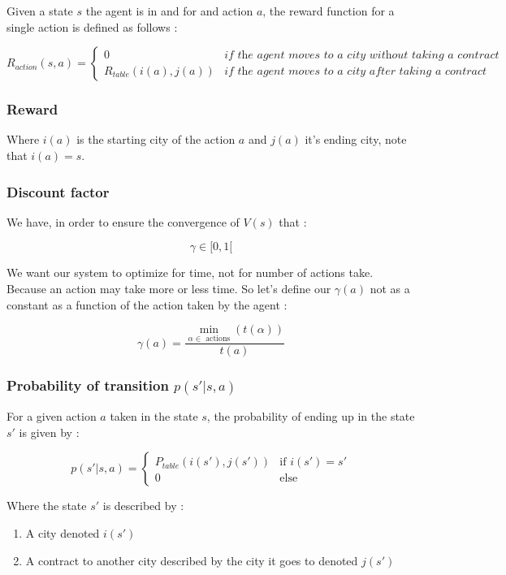 \documentclass[11pt]{article}
\begin{document}
Given a state $s$ the agent is in and for and action $a$, the reward function for a single action is defined as follows :

\[R_{action}(s,a) = \begin{cases}
    0               & \textit{if the agent moves to a city without taking a contract} \\
    R_{table}(i(a),j(a))    & \textit{if the agent moves to a city after taking a contract}
\end{cases}\]

\subsubsection{Reward}

Where  $i(a)$ is the starting city of the action $a$ and $j(a)$ it's ending city, note that $i(a) = s$.

\subsubsection{Discount factor}

We have, in order to ensure the convergence of $V(s)$ that :

\[ \gamma \in [0,1[ \]

We want our system to optimize for time, not for number of actions take. Because an action may take more or less time. So let's define our $\gamma(a)$ not as a constant as a function of the action taken by the agent :

\[\gamma (a) = \frac{ \underset{\alpha \in \text{ actions}}{\min} (t(\alpha))}{t(a)}\]


\subsubsection{Probability of transition $p(s'|s,a)$}

For a given action $a$ taken in the state $s$, the probability of ending up in the state $s'$ is given by :

\[p(s'|s,a) = \begin{cases}
    P_{table}(i(s'),j(s'))  & \text{if }i(s')=s' \\
    0                       & \text{else}
\end{cases}\]

Where the state $s'$ is described by : 
\begin{enumerate}
    \item A city denoted $i(s')$
    \item A contract to another city described by the city it goes to denoted $j(s')$
\end{enumerate}
\end{document}
